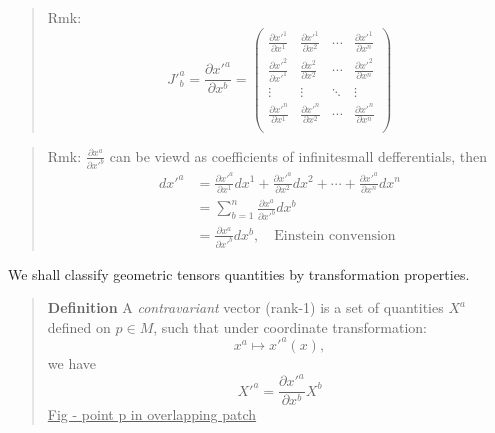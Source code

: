 \begin{quote}
	Rmk:
\begin{equation}
J'^{a}_{b} = \frac{\partial x'^{a}}{\partial x^{b}}
= \begin{pmatrix}
\frac{\partial x'^{1}}{\partial x^{1}} & \frac{\partial x'^{1}}{\partial x^{2}} & \cdots & \frac{\partial x'^{1}}{\partial x^{n}}\\
\frac{\partial x'^{2}}{\partial x'^{1}} & \frac{\partial x^{2}}{\partial x^{2}} & \cdots & \frac{\partial x'^{2}}{\partial x^{n}}\\
\vdots & \vdots & \ddots & \vdots \\
\frac{\partial x'^{n}}{\partial x^{1}} & \frac{\partial x'^{n}}{\partial x^{2}} & \cdots & \frac{\partial x'^{n}}{\partial x^{n}}\\
\end{pmatrix}
\end{equation}

\end{quote}
\begin{quote}
	Rmk:
$\frac{\partial x^{a}}{\partial x'^{b}}$ can be viewd as coefficients of infinitesmall defferentials, then
\begin{equation}
\begin{aligned}
dx'^{a} &=
\frac{\partial x'^{a}}{\partial x^{1}}dx^{1}
+ \frac{\partial x'^{a}}{\partial x^{2}}dx^{2}
+ \cdots
+ \frac{\partial x'^{a}}{\partial x^{n}}dx^{n} \\
&= \sum_{b=1}^{n} \frac{\partial x^{a}}{\partial x'^{b}} dx^{b}\\
&= \frac{\partial x^{a}}{\partial x'^{b}} dx^{b},\quad \text{Einstein convension}
\end{aligned}
\end{equation}

\end{quote}
We shall classify geometric tensors quantities by transformation properties.

\begin{quote}
	\textbf{Definition}
A \textit{contravariant} vector (rank-1) is a set of quantities $X^{a}$ defined on $p\in M$, such that under coordinate transformation:
\begin{equation}
x^{a}\mapsto x'^{a}(x),
\end{equation}
we have
\begin{equation}
X'^{a} = \frac{\partial x'^{a}}{\partial x^{b}} X^{b}
\end{equation}
\underline{Fig - point p in overlapping patch}
\end{quote}

